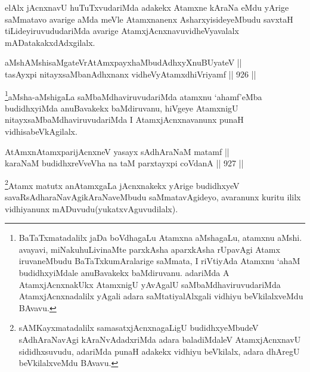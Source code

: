 \begin{artha}
elAlx jAcnxnavU huTuTxvudariMda adakekx Atamxne kAraNa eMdu yArige saMmatavo avarige aMda meVle Atamxnanenx AsharxyisideyeMbudu savxtaH tiLideyiruvududariMda avarige AtamxjAcnxnavu\break vidheVyavalalx mADatakakxdAdxgilalx.
\end{artha}


\begin{shl}
aMshAMshisaMgateVrAtAmx\s payxhaMbudAdhxyX\s nuBUyateV || \\
tasAyxpi nitayxsaMbanAdhxnanx vidheVyA\s \s tamxdhiVriyamf \hfill || 926 ||  
\end{shl}

\begin{artha}
\footnote{BaTaTxmatadalilx jaDa boVdhagaLu Atamxna aMshagaLu, atamxnu aMshi. avayavi, miNaku\break huLivinaMte parxkAsha aparxkAsha rUpavAgi Atamx iruvaneMbudu BaTaTxkumAralarige saMmata, I riVtiyAda Atamxnu `ahaM budidhxyiMdale anuBavakekx baMdiruvanu. adariMda A AtamxjAcnxnakUkx AtamxnigU yAvAgalU saMbaMdhaviruvudariMda AtamxjAcnxnadalilx yAgali adara saMtatiyalAlxgali vidhiyu beVkilalxveMdu BAvavu.}aMsha-aMshigaLa saMbaMdhaviruvudariMda atamxnu `ahamf'\break eMba budidhxyiMda anuBavakekx baMdiruvanu, hiVgeye AtamxnigU nitayxsaMbaMdhaviruvudariMda I AtamxjAcnxnavanunx punaH vidhisabeVkAgilalx.
\end{artha}


\begin{shl}
AtAmxnAtamxparijAcnxneV yasayx sAdhAraNaM matamf || \\
karaNaM budidhxreVveVha na taM parxtayxpi coVdanA \hfill || 927 ||  
\end{shl}

\begin{artha}
\footnote{sAMKayxmatadalilx samasatxjAcnxnagaLigU budidhxyeMbudeV sAdhAraNavAgi kAraNvAdadxriMda adara baladiMdaleV AtamxjAcnxnavU sididhxsuvudu, adariMda punaH adakekx vidhiyu beVkilalx, adara dhAregU beVkilalxveMdu BAvavu.}Atamx matutx anAtamxgaLa jAcnxnakekx yArige budidhxyeV savaRsAdharaNavAgikAraNaveMbudu saMmatavAgideyo, avaranunx kuritu ililx vidhiyanunx mADuvudu(yukatxvAguvudilalx).
\end{artha}


